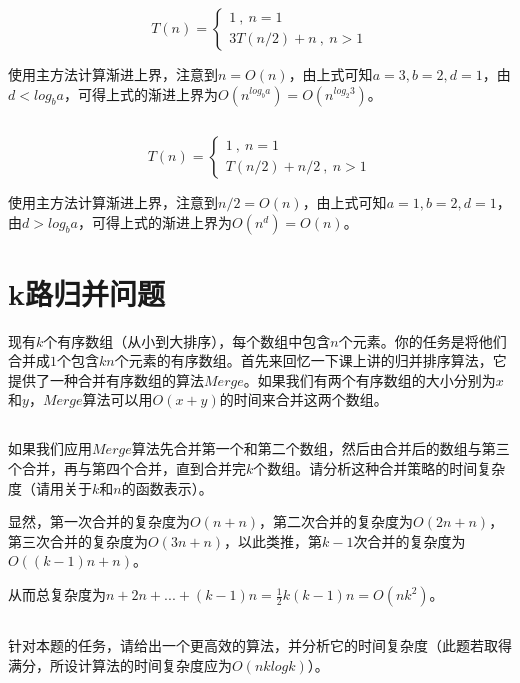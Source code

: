 \documentclass{article}
\begin{document}
$$
T(n)=\left\{
\begin{array}{l}
1\ ,\ n=1\\
3T(n/2)+n\ ,\ n>1
\end{array}
\right.
$$

使用主方法计算渐进上界，注意到$n=O(n)$，由上式可知$a=3,b=2,d=1$，由$d<log_b a$，可得上式的渐进上界为$O(n^{log_b a})=O(n^{log_2 3})$。

\subsection{}

$$
T(n)=\left\{
\begin{array}{l}
1\ ,\ n=1\\
T(n/2)+n/2\ ,\ n>1
\end{array}
\right.
$$

使用主方法计算渐进上界，注意到$n/2=O(n)$，由上式可知$a=1,b=2,d=1$，由$d>log_b a$，可得上式的渐进上界为$O(n^d)=O(n)$。

\section{k路归并问题}

现有$k$个有序数组（从小到大排序），每个数组中包含$n$个元素。你的任务是将他们合并成$1$个包含$kn$个元素的有序数组。首先来回忆一下课上讲的归并排序算法，它提供了一种合并有序数组的算法$Merge$。如果我们有两个有序数组的大小分别为$x$和$y$，$Merge$算法可以用$O(x+y)$的时间来合并这两个数组。

\subsection{}

如果我们应用$Merge$算法先合并第一个和第二个数组，然后由合并后的数组与第三个合并，再与第四个合并，直到合并完$k$个数组。请分析这种合并策略的时间复杂度（请用关于$k$和$n$的函数表示）。

显然，第一次合并的复杂度为$O(n+n)$，第二次合并的复杂度为$O(2n+n)$，第三次合并的复杂度为$O(3n+n)$，以此类推，第$k-1$次合并的复杂度为$O((k-1)n+n)$。

从而总复杂度为$n+2n+...+(k-1)n=\frac{1}{2}k(k-1)n=O(nk^2)$。

\subsection{}

针对本题的任务，请给出一个更高效的算法，并分析它的时间复杂度（此题若取得满分，所设计算法的时间复杂度应为$O(n k log k)$）。
\end{document}
